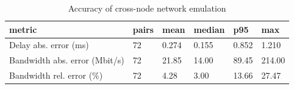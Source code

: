 \begin{table}[t]
\centering
\caption{Accuracy of cross-node network emulation}
\label{tab:ndm_accuracy_summary}
\scriptsize
\begin{tabular}{llllll}
\toprule
metric & pairs & mean & median & p95 & max \\
\midrule
Delay abs. error (ms) & 72 & 0.274 & 0.155 & 0.852 & 1.210 \\
Bandwidth abs. error (Mbit/s) & 72 & 21.85 & 14.00 & 89.45 & 214.00 \\
Bandwidth rel. error (\%) & 72 & 4.28 & 3.00 & 13.66 & 27.47 \\
\bottomrule
\end{tabular}
\end{table}
